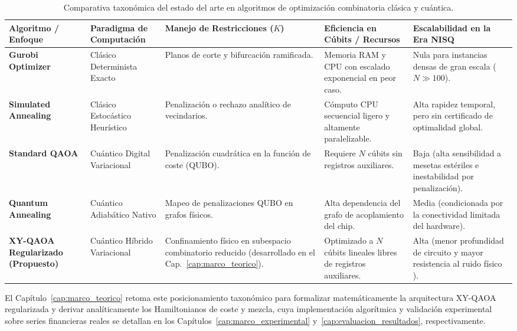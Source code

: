 \begin{table}[htbp]
    \centering
    \small
    \caption{Comparativa taxonómica del estado del arte en algoritmos de optimización combinatoria clásica y cuántica.}
    \label{tab:estado_arte}
    \renewcommand{\arraystretch}{1.3}
    \begin{tabular}{p{2.6cm}p{2.4cm}p{2.8cm}p{2.2cm}p{2.7cm}}
        \toprule
        \textbf{Algoritmo / Enfoque} & \textbf{Paradigma de Computación} & \textbf{Manejo de Restricciones ($K$)} & \textbf{Eficiencia en Cúbits / Recursos} & \textbf{Escalabilidad en la Era NISQ} \\
        \midrule
        \textbf{Gurobi Optimizer} \cite{Gurobi2025} & Clásico Determinista Exacto & Planos de corte y bifurcación ramificada. & Memoria RAM y CPU con escalado exponencial en peor caso. & Nula para instancias densas de gran escala ($N \gg 100$). \\
        \addlinespace
        \textbf{Simulated Annealing} & Clásico Estocástico Heurístico & Penalización o rechazo analítico de vecindarios. & Cómputo CPU secuencial ligero y altamente paralelizable. & Alta rapidez temporal, pero sin certificado de optimalidad global. \\
        \addlinespace
        \textbf{Standard QAOA} \cite{Farhi2014} & Cuántico Digital Variacional & Penalización cuadrática en la función de coste (QUBO). & Requiere $N$ cúbits sin registros auxiliares. & Baja (alta sensibilidad a mesetas estériles e inestabilidad por penalización). \\
        \addlinespace
        \textbf{Quantum Annealing} & Cuántico Adiabático Nativo & Mapeo de penalizaciones QUBO en grafos físicos. & Alta dependencia del grafo de acoplamiento del chip. & Media (condicionada por la conectividad limitada del hardware). \\
        \addlinespace
        \textbf{XY-QAOA Regularizado (Propuesto)} & Cuántico Híbrido Variacional & Confinamiento físico en subespacio combinatorio reducido (desarrollado en el Cap.~\ref{cap:marco_teorico}). & Optimizado a $N$ cúbits lineales libres de registros auxiliares. & Alta (menor profundidad de circuito y mayor resistencia al ruido físico \cite{Barkoutsos2020}). \\
        \bottomrule
    \end{tabular}
\end{table}

El Capítulo~\ref{cap:marco_teorico} retoma este posicionamiento taxonómico para formalizar matemáticamente la arquitectura XY-QAOA regularizada y derivar analíticamente los Hamiltonianos de coste y mezcla, cuya implementación algorítmica y validación experimental sobre series financieras reales se detallan en los Capítulos~\ref{cap:marco_experimental} y~\ref{cap:evaluacion_resultados}, respectivamente.
